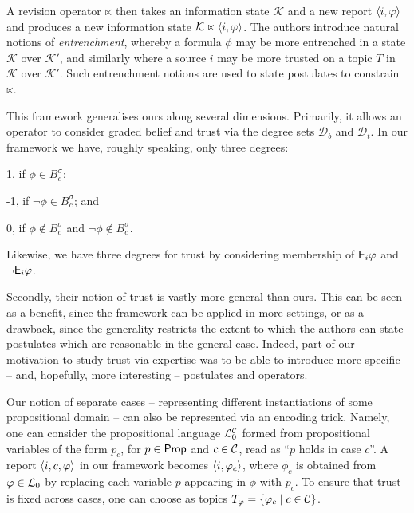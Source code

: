 %
A revision operator $\ltimes$ then takes an information state
$\mathcal{K}$ and a new report $\langle {i, \varphi} \rangle$ and produces a new information
state $\mathcal{K} \ltimes \langle {i, \varphi} \rangle$. The authors introduce natural
notions of \emph{entrenchment}, whereby a formula $\phi$ may be more entrenched
in a state $\mathcal{K}$ over $\mathcal{K'}$, and similarly where a source $i$
may be more trusted on a topic $T$ in $\mathcal{K}$ over $\mathcal{K'}$. Such
entrenchment notions are used to state postulates to constrain $\ltimes$.

This framework generalises ours along several dimensions. Primarily, it allows
an operator to consider graded belief and trust via the degree sets
$\mathcal{D}_b$ and $\mathcal{D}_t$. In our framework we have, roughly
speaking, only three degrees:
%
\begin{inlinelist}
    \item 1, if $\phi \in B^\sigma_c$;
    \item -1, if $\neg\phi \in B^\sigma_c$; and
    \item 0, if $\phi \notin B^\sigma_c$ and $\neg\phi \notin B^\sigma_c$.
\end{inlinelist}
Likewise, we have three degrees for trust by considering membership of
$\mathsf{E}_i\varphi$ and $\neg\mathsf{E}_i\varphi$.

Secondly, their notion of trust is vastly more general than ours. This can be
seen as a benefit, since the framework can be applied in more settings, or
as a drawback, since the generality restricts the extent to which the authors
can state postulates which are reasonable in the general case. Indeed, part of
our motivation to study trust via expertise was to be able to introduce more
specific -- and, hopefully, more interesting -- postulates and operators.

Our notion of separate cases -- representing different instantiations of some
propositional domain -- can also be represented via an encoding trick. Namely,
one can consider the propositional language $\mathcal{L}{}_0^{\mathcal{C}}$ formed from
propositional variables of the form $p_c$, for $p \in \mathsf{Prop}$ and $c \in
\mathcal{C}$, read as ``$p$ holds in case $c$''. A report $\langle {i, c, \varphi} \rangle$ in our
framework becomes $\langle {i, \varphi_c} \rangle$, where $\phi_c$ is obtained from $\varphi
\in \mathcal{L}{}_0$ by replacing each variable $p$ appearing in $\phi$ with $p_c$. To
ensure that trust is fixed across cases, one can choose as topics $T_\varphi =
\{\varphi_c \mid c \in \mathcal{C}\}$.

